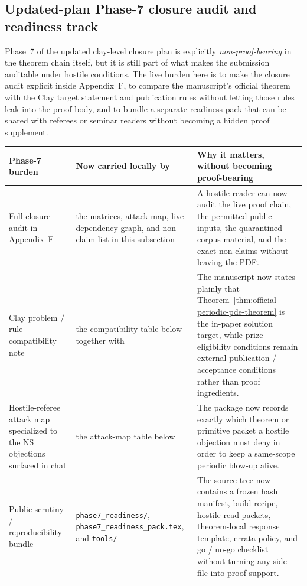 \subsection*{Updated-plan Phase-7 closure audit and readiness track}
Phase~7 of the updated clay-level closure plan is explicitly \emph{non-proof-bearing} in the theorem chain itself, but it is still part of what makes the submission auditable under hostile conditions. The live burden here is to make the closure audit explicit inside Appendix~F, to compare the manuscript's official theorem with the Clay target statement and publication rules without letting those rules leak into the proof body, and to bundle a separate readiness pack that can be shared with referees or seminar readers without becoming a hidden proof supplement.

\begin{center}
\footnotesize
\renewcommand{\arraystretch}{1.16}
\setlength{\tabcolsep}{4pt}
\begin{tabularx}{0.98\textwidth}{@{}L{0.31\textwidth}L{0.24\textwidth}Y@{}}
\toprule
\textbf{Phase-7 burden} & \textbf{Now carried locally by} & \textbf{Why it matters, without becoming proof-bearing}\\
\midrule
Full closure audit in Appendix~F & the matrices, attack map, live-dependency graph, and non-claim list in this subsection & A hostile reader can now audit the live proof chain, the permitted public inputs, the quarantined corpus material, and the exact non-claims without leaving the PDF.\\
Clay problem / rule compatibility note & the compatibility table below together with \cite{fefferman-navierstokes-problem,cmi-millennium-rules} & The manuscript now states plainly that Theorem~\ref{thm:official-periodic-pde-theorem} is the in-paper solution target, while prize-eligibility conditions remain external publication / acceptance conditions rather than proof ingredients.\\
Hostile-referee attack map specialized to the NS objections surfaced in chat & the attack-map table below & The package now records exactly which theorem or primitive packet a hostile objection must deny in order to keep a same-scope periodic blow-up alive.\\
Public scrutiny / reproducibility bundle & \texttt{phase7\_readiness/}, \texttt{phase7\_readiness\_pack.tex}, and \texttt{tools/} & The source tree now contains a frozen hash manifest, build recipe, hostile-read packets, theorem-local response template, errata policy, and go / no-go checklist without turning any side file into proof support.\\
\bottomrule
\end{tabularx}
\end{center}

